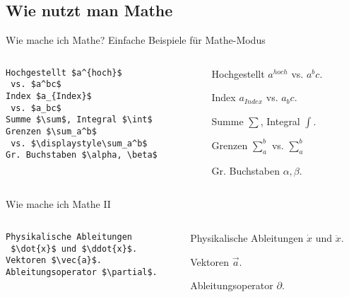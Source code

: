 \subsection{Wie nutzt man Mathe}

\begin{frame}[fragile]{Wie mache ich Mathe?}
Einfache Beispiele für Mathe-Modus
\begin{columns}
\begin{column}{0.55\textwidth}
\begin{codeblock}
\begin{verbatim}
Hochgestellt $a^{hoch}$ 
 vs. $a^bc$
Index $a_{Index}$ 
 vs. $a_bc$
Summe $\sum$, Integral $\int$
Grenzen $\sum_a^b$ 
 vs. $\displaystyle\sum_a^b$
Gr. Buchstaben $\alpha, \beta$
\end{verbatim}
\end{codeblock}
\end{column}
\pause
\begin{column}{0.4\textwidth}
Hochgestellt $a^{hoch}$ vs. $a^bc$. 

\medskip\pause
Index $a_{Index}$ vs. $a_bc$.

\medskip\pause
Summe $\sum$, Integral $\int$.

\medskip\pause
Grenzen $\sum_a^b$ vs. $\displaystyle \sum_a^b$

\medskip\pause
Gr. Buchstaben $\alpha, \beta$.
\end{column}
\end{columns}
\end{frame}


\begin{frame}[fragile]{Wie mache ich Mathe II}
\begin{columns}
\begin{column}{0.55\textwidth}
\begin{codeblock}
\begin{verbatim}
Physikalische Ableitungen 
 $\dot{x}$ und $\ddot{x}$. 
Vektoren $\vec{a}$.
Ableitungsoperator $\partial$.
\end{verbatim}
\end{codeblock}
\end{column}
\pause
\begin{column}{0.4\textwidth}
Physikalische Ableitungen $\dot{x}$ und $\ddot{x}$. 

\medskip\pause
Vektoren $\vec{a}$.

\medskip\pause
Ableitungsoperator $\partial$.
\end{column}
\end{columns}
\end{frame}

